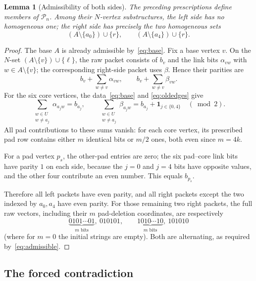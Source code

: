\documentclass[11pt,a4paper]{article}
\newtheorem{lemma}[theorem]{Lemma}
\theoremstyle{remark}
\begin{document}
\begin{lemma}[Admissibility of both sides]\label{lem:p1-sides}
The preceding prescriptions define members of $\mathcal P_n$.
Among their $N$-vertex substructures, the left side has no
homogeneous one; the right side has precisely the two homogeneous
sets
\[
 (A\setminus\{a_0\})\cup\{r\},\qquad
 (A\setminus\{a_4\})\cup\{r\}.
\]
\end{lemma}
\begin{proof}
The base $A$ is already admissible by~\eqref{eq:base}.
Fix a base vertex $v$. On the $N$-set
$(A\setminus\{v\})\cup\{\ell\}$, the raw packet consists of
$b_v$ and the link bits $\alpha_{vw}$ with $w\in A\setminus\{v\}$;
the corresponding right-side packet uses $\beta$. Hence their
parities are
\[
 b_v+\sum_{w\ne v}\alpha_{vw},\qquad
 b_v+\sum_{w\ne v}\beta_{vw}.
\]
For the six core vertices, the data~\eqref{eq:base} and
\eqref{eq:oldedges} give
\[
 \sum_{\substack{w\in U\\w\ne a_j}}\alpha_{a_jw}=b_{a_j},
 \qquad
 \sum_{\substack{w\in U\\w\ne a_j}}\beta_{a_jw}
 =b_{a_j}+\mathbf1_{j\in\{0,4\}}
 \quad(\bmod2).
\]
All pad contributions to these sums vanish: for each core vertex,
its prescribed pad row contains either $m$ identical bits or $m/2$
ones, both even since $m=4k$.

For a pad vertex $p_s$, the other-pad entries are zero; the six
pad--core link bits have parity $1$ on each side, because the $j=0$
and $j=4$ bits have opposite values, and the other four contribute
an even number. This equals $b_{p_s}$.

Therefore all left packets have even parity, and all right packets
except the two indexed by $a_0,a_4$ have even parity. For those
remaining two right packets, the full raw vectors, including their
$m$ pad-deletion coordinates, are respectively
\[
 \underbrace{0101\cdots01}_{m\text{ bits}},\ 010101,
 \qquad
 \underbrace{1010\cdots10}_{m\text{ bits}},\ 101010
\]
(where for $m=0$ the initial strings are empty). Both are
alternating, as required by~\eqref{eq:admissible}.
\end{proof}

\subsection{The forced contradiction}
\end{document}
